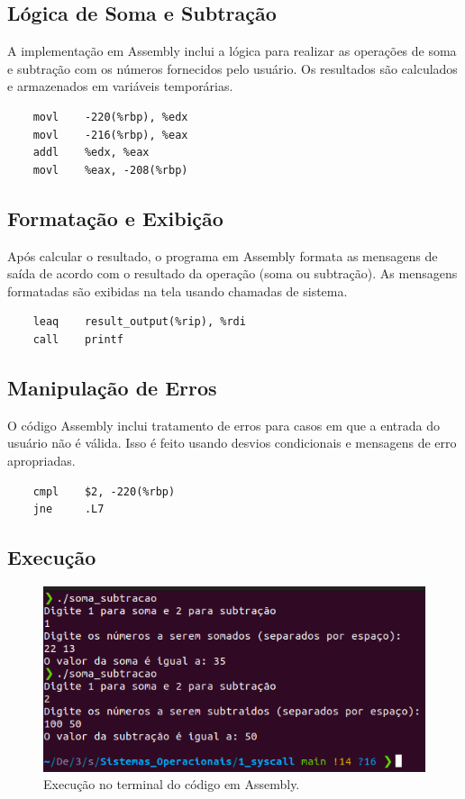 \documentclass[
	12pt,				%
	openright,			%
	oneside,			%
	a4paper,			%
	chapter=TITLE,		%
	english,			%
	french,				%
	spanish,			%
	brazil				%
	]{abntex2}
\theoremstyle{definition}
\begin{document}
\subsection{Lógica de Soma e Subtração}

A implementação em Assembly inclui a lógica para realizar as operações de soma e 
subtração com os números fornecidos pelo usuário. Os resultados são calculados e 
armazenados em variáveis temporárias.

\begin{verbatim}
    movl    -220(%rbp), %edx
    movl    -216(%rbp), %eax
    addl    %edx, %eax
    movl    %eax, -208(%rbp)
\end{verbatim}

\subsection{Formatação e Exibição}

Após calcular o resultado, o programa em Assembly formata as mensagens de saída de acordo 
com o resultado da operação (soma ou subtração). As mensagens formatadas são exibidas na 
tela usando chamadas de sistema.

\begin{verbatim}
    leaq    result_output(%rip), %rdi
    call    printf
\end{verbatim}

\subsection{Manipulação de Erros}

O código Assembly inclui tratamento de erros para casos em que a entrada do usuário não é 
válida. Isso é feito usando desvios condicionais e mensagens de erro apropriadas.

\begin{verbatim}
    cmpl    $2, -220(%rbp)
    jne     .L7
\end{verbatim}

\subsection{Execução}

\begin{figure}
    \centering
    \includegraphics[width=1.0\textwidth]{imagens/run_asm.png}
	\caption{Execução no terminal do código em Assembly.}
	\label{fig:run_asm}
\end{figure}
\end{document}
